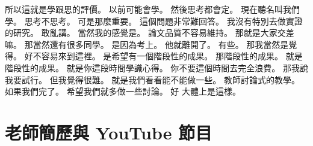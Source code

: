 \hypertarget{w01:cue:533}{}所以這就是學跟思的評價。
\hypertarget{w01:cue:534}{}以前可能會學。
\hypertarget{w01:cue:535}{}然後思考都會定。
\hypertarget{w01:cue:536}{}現在聽名叫我們學。
\hypertarget{w01:cue:537}{}思考不思考。
\hypertarget{w01:cue:538}{}可是那麼重要。
\hypertarget{w01:cue:539}{}這個問題非常難回答。
\hypertarget{w01:cue:540}{}我沒有特別去做實證的研究。
\hypertarget{w01:cue:541}{}敢亂講。
\hypertarget{w01:cue:542}{}當然我的感覺是。
\hypertarget{w01:cue:543}{}論文品質不容易維持。
\hypertarget{w01:cue:544}{}那就是大家交差嘛。
\hypertarget{w01:cue:545}{}那當然還有很多同學。
\hypertarget{w01:cue:546}{}是因為考上。
\hypertarget{w01:cue:547}{}他就離開了。
\hypertarget{w01:cue:548}{}有些。
\hypertarget{w01:cue:549}{}那我當然是覺得。
\hypertarget{w01:cue:550}{}好不容易來到這裡。
\hypertarget{w01:cue:551}{}是希望有一個階段性的成果。
\hypertarget{w01:cue:552}{}那階段性的成果。
\hypertarget{w01:cue:553}{}就是階段性的成果。
\hypertarget{w01:cue:554}{}就是你這段時間學識心得。
\hypertarget{w01:cue:555}{}你不要這個時間去完全浪費。
\hypertarget{w01:cue:556}{}那我說我要試行。
\hypertarget{w01:cue:557}{}但我覺得很難。
\hypertarget{w01:cue:558}{}就是我們看看能不能做一些。
\hypertarget{w01:cue:559}{}教師討論式的教學。
\hypertarget{w01:cue:560}{}如果我們完了。
\hypertarget{w01:cue:561}{}希望我們就多做一些討論。
\hypertarget{w01:cue:562}{}好 大體上是這樣。

\section{老師簡歷與 YouTube 節目}

